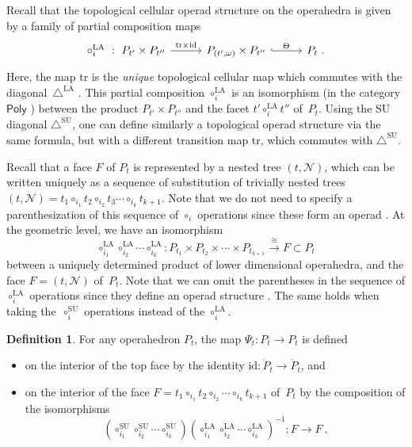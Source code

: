 \documentclass{amsart}
\theoremstyle{definition}
\newtheorem{definition}[theorem]{Definition}
\newcommand{\SU}{\mathrm{SU}}
\newcommand{\LA}{\mathrm{LA}}
\newcommand{\SUD}{\triangle^{\mathrm{SU}}}
\newcommand{\LAD}{\triangle^{\mathrm{LA}}}
\newcommand{\PolySub}{\mathsf{Poly}}
\newcommand{\tr}{\mathrm{tr}}
\newcommand{\id}{\mathrm{id}}
\begin{document}
Recall that the topological cellular operad structure on the operahedra \cite[Def.~4.17]{LA21} is given by a family of partial composition maps 
\[
\vcenter{\hbox{
\begin{tikzcd}[column sep=1cm]
\circ_i^{\LA}\ : \ P_{t'}\times P_{t''}
\arrow[r,  "\tr\times \id"]
& P_{(t',\omega)}\times P_{t''}
 \arrow[r,hookrightarrow, "\Theta"]
&
P_t \ .
\end{tikzcd}
}}  \]
Here, the map $\tr$ is the \emph{unique} topological cellular map which commutes with the diagonal~$\LAD$ \cite[Prop.~7]{masudaDiagonalAssociahedra2021}. 
This partial composition $\circ_i^\LA$ is an isomorphism (in the category $\PolySub$ \cite[Def.~4.13]{LA21}) between the product $P_{t'}\times P_{t''}$ and the facet $t' \circ_i^\LA t''$ of~$P_t$.
Using the $\SU$ diagonal $\SUD$, one can define similarly a topological operad structure via the same formula, but with a different transition map $\tr$, which commutes with $\SUD$.

Recall that a face $F$ of $P_t$ is represented by a nested tree $(t,\mathcal{N})$, which can be written uniquely as a sequence of substitution of trivially nested trees 
$(t,\mathcal{N})=t_1\circ_{i_1} t_2 \circ_{i_2} t_3 \cdots \circ_{i_k} t_{k+1}$.
Note that we do not need to specify a parenthesization of this sequence of $\circ_i$ operations since these form an operad \cite[Def.~4.7]{LA21}.
At the geometric level, we have an isomorphism
\[\circ_{i_1}^\LA \circ_{i_2}^\LA \cdots \circ_{i_k}^\LA: P_{t_1} \times P_{t_2} \times \cdots \times P_{t_{k+1}} \overset{\cong}{\longrightarrow} F \subset P_t \]
between a uniquely determined product of lower dimensional operahedra, and the face $F=(t,\mathcal{N})$ of~$P_t$.
Note that we can omit the parentheses in the sequence of $\circ_i^\LA$ operations since they define an operad structure \cite[Thm.~4.18]{LA21}.
The same holds when taking the~$\circ_i^\SU$ operations instead of the $\circ_i^\LA$. 

\begin{definition}
    For any operahedron $P_t$, the map $\Psi_t : P_t \to P_t$ is defined 
    \begin{itemize}
        \item on the interior of the top face by the identity $\id : \mathring P_t \to \mathring P_t$, and 
        \item on the interior of the face $F=t_1 \circ_{i_1} t_2 \circ_{i_2} \cdots \circ_{i_k} t_{k+1}$ of~$P_t$ by the composition of the isomorphisms
        \[ 
        (\circ_{i_1}^\SU \circ_{i_2}^\SU \cdots \circ_{i_k}^\SU) (\circ_{i_1}^\LA \circ_{i_2}^\LA \cdots \circ_{i_k}^\LA)^{-1}: F \to F \ . \] 
    \end{itemize}
\end{definition}
\end{document}
